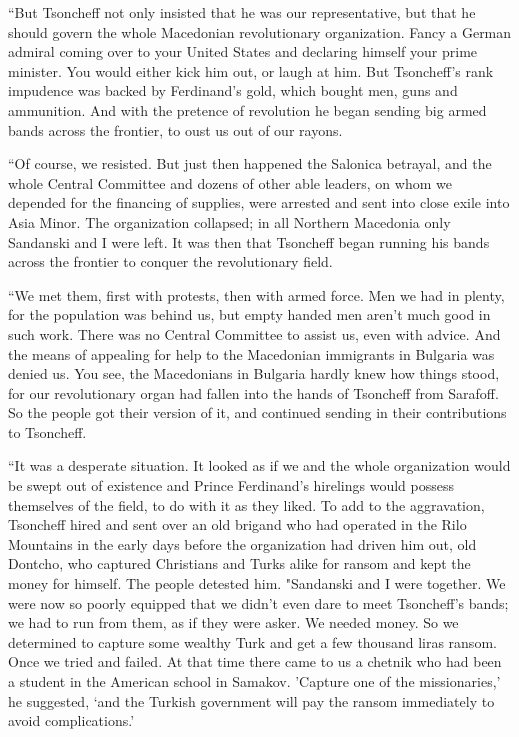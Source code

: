 \documentclass[a5paper,12pt]{book}
\begin{document}
“But Tsoncheff not only insisted that he was our representative, but that he should govern the whole Macedonian revolutionary organization. Fancy a German admiral coming over to your United States and declaring himself your prime minister. You would either kick him out, or laugh at him. But Tsoncheff's rank impudence was backed by Ferdinand's gold, which bought men, guns and ammunition. And with the pretence of revolution he began sending big armed bands across the frontier, to oust us out of our rayons.

“Of course, we resisted. But just then happened the Salonica betrayal, and the whole Central Committee and dozens of other able leaders, on whom we depended for the financing of supplies, were arrested and sent into close exile into Asia Minor. The organization collapsed; in all Northern Macedonia only Sandanski and I were left. It was then that Tsoncheff began running his bands across the frontier to conquer the revolutionary field.

“We met them, first with protests, then with armed force. Men we had in plenty, for the population was behind us, but empty handed men aren't much good in such work. There was no Central Committee to assist us, even with advice. And the means of appealing for help to the Macedonian immigrants in Bulgaria was denied us. You see, the Macedonians in Bulgaria hardly knew how things stood, for our revolutionary organ had fallen into the hands of Tsoncheff from Sarafoff. So the people got their version of it, and continued sending in their contributions to Tsoncheff.

“It was a desperate situation. It looked as if we and the whole organization would be swept out of existence and Prince Ferdinand’s hirelings would possess themselves of the field, to do with it as they liked. To add to the aggravation, Tsoncheff hired and sent over an old brigand who had operated in the Rilo Mountains in the early days before the organization had driven him out, old Dontcho, who captured Christians and Turks alike for ransom and kept the money for himself. The people detested him.
"Sandanski and I were together. We were now so poorly equipped that we didn’t even dare to meet Tsoncheff’s bands; we had to run from them, as if they were asker. We needed money. So we determined to capture some wealthy Turk and get a few thousand liras ransom. Once we tried and failed. At that time there came to us a chetnik who had been a student in the American school in Samakov. 'Capture one of the missionaries,' he suggested, ‘and the Turkish government will pay the ransom immediately to avoid complications.'
\end{document}
